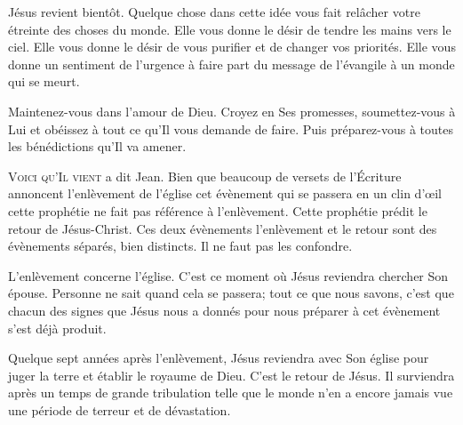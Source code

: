 Jésus revient bientôt. Quelque chose dans cette idée vous fait
 relâcher votre étreinte des choses du monde.
 Elle vous donne le désir de tendre les mains vers le ciel.
 Elle vous donne le désir de vous purifier et de changer vos priorités.
 Elle vous donne un sentiment de l'urgence à faire part du message
 de l'évangile à un monde qui se meurt. 

Maintenez-vous dans l'amour de Dieu. Croyez en Ses promesses,
 soumettez-vous à Lui et obéissez à tout ce qu'Il vous demande de faire.
 Puis préparez-vous à toutes les bénédictions qu'Il va amener. 

\dvrule







\lettrine[ante=\og]{V}{oici qu'Il vient \fg{}} 
 a dit Jean.
 Bien que beaucoup de versets de l'Écriture annoncent
 l'enlèvement de l'église 
 \ocadr cet évènement qui se passera en un clin d'œil \fcadr{} 
 cette prophétie ne fait pas référence à l'enlèvement.
 Cette prophétie prédit le retour de Jésus-Christ.
 Ces deux évènements \ocadr l'enlèvement et le retour \fcadr{}
 sont des évènements séparés, bien distincts.
 Il ne faut pas les confondre. 

L'enlèvement concerne l'église. 
 C'est ce moment où Jésus reviendra chercher Son épouse.
 Personne ne sait quand cela se passera; tout ce que nous savons,
 c'est que chacun des signes que Jésus nous a donnés pour nous préparer
 à cet évènement s'est déjà produit. 


Quelque  sept années après l'enlèvement,
 Jésus reviendra avec Son église pour juger la terre
 et établir le royaume de Dieu. C'est le retour de Jésus.
 Il surviendra après un temps de grande tribulation
 telle que le monde n'en a encore jamais vue
 \ocadr une période de terreur et de dévastation. 


